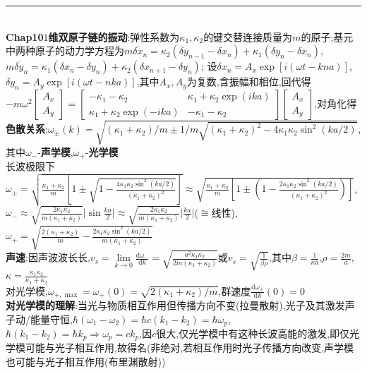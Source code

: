 \documentclass[UTF8,10pt,a4paper]{article}
\providecommand{\abs}[1]{\lvert#1\rvert}
\begin{document}
\begin{multicols}{2}
\rule{\columnwidth}{.2pt}\\
\textbf{Chap10$1$维双原子链的振动}:弹性系数为$\kappa_1,\kappa_2$的键交替连接质量为$m$的原子;基元中两种原子的动力学方程为$m\ddot{\delta x_n}=\kappa_2(\delta y_{n-1}-\delta x_n)+\kappa_1(\delta y_n-\delta x_n)$,$m\ddot{\delta y_n}=\kappa_1(\delta x_n-\delta y_n)+\kappa_2(\delta x_{n+1}-\delta y_n)$; 设$\delta x_n=A_x\exp[i(\omega t-kna)]$,$\delta y_n=A_y\exp[i(\omega t-nka)]$,其中$A_x,A_y$为复数,含振幅和相位,回代得$-m\omega^2\left[\begin{smallmatrix}
    A_x\\
    A_y
\end{smallmatrix}\right]=\left[\begin{smallmatrix}
    -\kappa_1-\kappa_2&\kappa_1+\kappa_2\exp(ika)\\
    \kappa_1+\kappa_2\exp(-ika)&-\kappa_1-\kappa_2
\end{smallmatrix}\right]\left[\begin{smallmatrix}
    A_x\\
    A_y
\end{smallmatrix}\right]$,对角化得\textbf{色散关系}:$\omega_{\pm}(k)=\sqrt{(\kappa_1+\kappa_2)/m\pm 1/m\sqrt{(\kappa_1+\kappa_2)^2-4\kappa_1\kappa_2\sin^2(ka/2)}}$,其中$\omega_-$-\textbf{声学模},$\omega_+$-\textbf{光学模}\\
长波极限下$\omega_{\pm}=\sqrt{\frac{\kappa_1+\kappa_2}{m}\left[1\pm\sqrt{1-\frac{4\kappa_1\kappa_2\sin^2(ka/2)}{(\kappa_1+\kappa_2)^2}}\right]}\approx\sqrt{\frac{\kappa_1+\kappa_2}{m}\left[1\pm\left(1-\frac{2\kappa_1\kappa_2\sin^2(ka/2)}{(\kappa_1+\kappa_2)^2}\right)\right]}$, $\omega_-\approx\sqrt{\frac{2\kappa_1\kappa_2}{m(\kappa_1+\kappa_2)}}\abs{\sin\frac{ka}{2}}\approx\sqrt{\frac{2\kappa_1\kappa_2}{m(\kappa_1+\kappa_2)}}\abs{\frac{ka}{2}}$($\cong$线性),$\omega_+=\sqrt{\frac{2(\kappa_1+\kappa_2)}{m}-\frac{2\kappa_1\kappa_2\sin^2(ka/2)}{m(\kappa_1+\kappa_2)}}$\\
\textbf{声速}:因声波波长长,$v_s=\lim\limits_{k\rightarrow 0}\frac{\mathrm{d}\omega_-}{\mathrm{d}k}=\sqrt{\frac{a^2\kappa_1\kappa_2}{2m(\kappa_1+\kappa_2)}}$或$v_s=\sqrt{\frac{1}{\beta\rho}}$,其中$\beta=\frac{1}{\kappa a}$,$\rho=\frac{2m}{a}$,$\kappa=\frac{\kappa_1\kappa_2}{\kappa_1+\kappa_2}$\\
对光学模,$\omega_{+,\max}=\omega_+(0)=\sqrt{2(\kappa_1+\kappa_2)/m}$,群速度$\frac{\mathrm{d}\omega_+}{\mathrm{d}k}(0)=0$\\%
\textbf{对光学模的理解}:当光与物质相互作用但传播方向不变(拉曼散射),光子及其激发声子动/能量守恒,$\hbar(\omega_1-\omega_2)=\hbar c(k_1-k_2)=\hbar\omega_p$, $\hbar(k_1-k_2)=\hbar k_p\Rightarrow\omega_p=ck_p$,因$c$很大,仅光学模中有这种长波高能的激发,即仅光学模可能与光子相互作用,故得名(非绝对,若相互作用时光子传播方向改变,声学模也可能与光子相互作用(布里渊散射))\\

\end{multicols}
\end{document}
